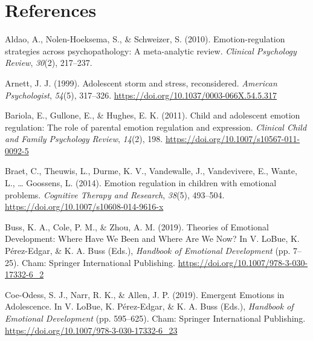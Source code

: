 \documentclass[
  english,
  man]{apa6}
\begin{document}
\newpage

\hypertarget{references}{%
\section{References}\label{references}}

\begingroup
\setlength{\parindent}{-0.5in}
\setlength{\leftskip}{0.5in}

\hypertarget{refs}{}
\leavevmode\hypertarget{ref-aldaoEmotionregulationStrategiesPsychopathology2010}{}%
Aldao, A., Nolen-Hoeksema, S., \& Schweizer, S. (2010). Emotion-regulation strategies across psychopathology: A meta-analytic review. \emph{Clinical Psychology Review}, \emph{30}(2), 217--237.

\leavevmode\hypertarget{ref-arnettAdolescentStormStress1999}{}%
Arnett, J. J. (1999). Adolescent storm and stress, reconsidered. \emph{American Psychologist}, \emph{54}(5), 317--326. \url{https://doi.org/10.1037/0003-066X.54.5.317}

\leavevmode\hypertarget{ref-bariolaChildAdolescentEmotion2011}{}%
Bariola, E., Gullone, E., \& Hughes, E. K. (2011). Child and adolescent emotion regulation: The role of parental emotion regulation and expression. \emph{Clinical Child and Family Psychology Review}, \emph{14}(2), 198. \url{https://doi.org/10.1007/s10567-011-0092-5}

\leavevmode\hypertarget{ref-braetEmotionRegulationChildren2014}{}%
Braet, C., Theuwis, L., Durme, K. V., Vandewalle, J., Vandevivere, E., Wante, L., \ldots{} Goossens, L. (2014). Emotion regulation in children with emotional problems. \emph{Cognitive Therapy and Research}, \emph{38}(5), 493--504. \url{https://doi.org/10.1007/s10608-014-9616-x}

\leavevmode\hypertarget{ref-bussTheoriesEmotionalDevelopment2019}{}%
Buss, K. A., Cole, P. M., \& Zhou, A. M. (2019). Theories of Emotional Development: Where Have We Been and Where Are We Now? In V. LoBue, K. Pérez-Edgar, \& K. A. Buss (Eds.), \emph{Handbook of Emotional Development} (pp. 7--25). Cham: Springer International Publishing. \url{https://doi.org/10.1007/978-3-030-17332-6_2}

\leavevmode\hypertarget{ref-coe-odessEmergentEmotionsAdolescence2019}{}%
Coe-Odess, S. J., Narr, R. K., \& Allen, J. P. (2019). Emergent Emotions in Adolescence. In V. LoBue, K. Pérez-Edgar, \& K. A. Buss (Eds.), \emph{Handbook of Emotional Development} (pp. 595--625). Cham: Springer International Publishing. \url{https://doi.org/10.1007/978-3-030-17332-6_23}
\end{document}
